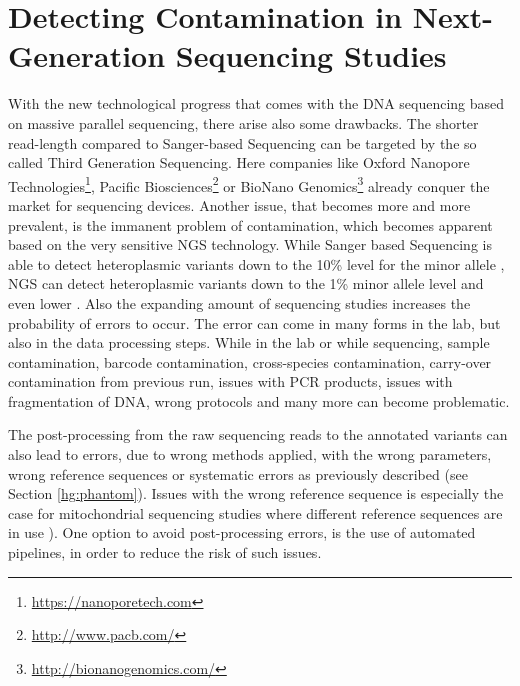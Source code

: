 \chapter{Detecting Contamination in Next-Generation Sequencing Studies}
\label{chapterContamination}
With the new technological progress that comes with the DNA sequencing based on massive parallel sequencing, there arise also some drawbacks. The shorter read-length compared to Sanger-based Sequencing can be targeted by the so called Third Generation Sequencing. Here companies like Oxford Nanopore Technologies\footnote{\url{https://nanoporetech.com}}, Pacific Biosciences\footnote{\url{http://www.pacb.com/}} or BioNano Genomics\footnote{\url{http://bionanogenomics.com/}} already conquer the market for sequencing devices. Another issue, that becomes more and more prevalent, is the immanent problem of contamination, which becomes apparent based on the very sensitive NGS technology. While Sanger based Sequencing is able to detect heteroplasmic variants down to the 10\% level for the minor allele \cite{Kloss-Brandstatter2015}, NGS can detect heteroplasmic variants down to the 1\% minor allele level and even lower \cite{Li2010}. Also the expanding amount of sequencing studies increases the probability of errors to occur. The error can come in many forms in the lab, but also in the data processing steps. While in the lab or while sequencing, sample contamination, barcode contamination, cross-species contamination, carry-over contamination from previous run, issues with PCR products, issues with fragmentation of DNA, wrong protocols and many more can become problematic. 

The post-processing from the raw sequencing reads to the annotated variants can also lead to errors, due to wrong methods applied, with the wrong parameters, wrong reference sequences or systematic errors as previously described (see Section \ref{hg:phantom}). Issues with the wrong reference sequence is especially the case for mitochondrial sequencing studies where different reference sequences are in use \cite{Behar2012,Andrews1999}). One option to avoid post-processing errors, is the use of automated pipelines, in order to reduce the risk of such issues. 

